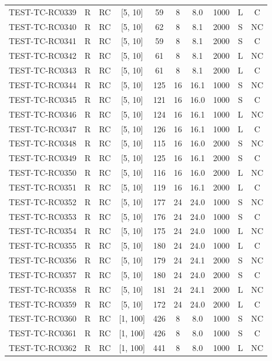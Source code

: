 \begin{longtable}{lccccccccc}
TEST-TC-RC0339 & R & RC & [5, 10] & 59 & 8 & 8.0 & 1000 & L & C \\
TEST-TC-RC0340 & R & RC & [5, 10] & 62 & 8 & 8.1 & 2000 & S & NC \\
TEST-TC-RC0341 & R & RC & [5, 10] & 59 & 8 & 8.1 & 2000 & S & C \\
TEST-TC-RC0342 & R & RC & [5, 10] & 61 & 8 & 8.1 & 2000 & L & NC \\
TEST-TC-RC0343 & R & RC & [5, 10] & 61 & 8 & 8.1 & 2000 & L & C \\
TEST-TC-RC0344 & R & RC & [5, 10] & 125 & 16 & 16.1 & 1000 & S & NC \\
TEST-TC-RC0345 & R & RC & [5, 10] & 121 & 16 & 16.0 & 1000 & S & C \\
TEST-TC-RC0346 & R & RC & [5, 10] & 124 & 16 & 16.1 & 1000 & L & NC \\
TEST-TC-RC0347 & R & RC & [5, 10] & 126 & 16 & 16.1 & 1000 & L & C \\
TEST-TC-RC0348 & R & RC & [5, 10] & 115 & 16 & 16.0 & 2000 & S & NC \\
TEST-TC-RC0349 & R & RC & [5, 10] & 125 & 16 & 16.1 & 2000 & S & C \\
TEST-TC-RC0350 & R & RC & [5, 10] & 116 & 16 & 16.0 & 2000 & L & NC \\
TEST-TC-RC0351 & R & RC & [5, 10] & 119 & 16 & 16.1 & 2000 & L & C \\
TEST-TC-RC0352 & R & RC & [5, 10] & 177 & 24 & 24.0 & 1000 & S & NC \\
TEST-TC-RC0353 & R & RC & [5, 10] & 176 & 24 & 24.0 & 1000 & S & C \\
TEST-TC-RC0354 & R & RC & [5, 10] & 175 & 24 & 24.0 & 1000 & L & NC \\
TEST-TC-RC0355 & R & RC & [5, 10] & 180 & 24 & 24.0 & 1000 & L & C \\
TEST-TC-RC0356 & R & RC & [5, 10] & 179 & 24 & 24.1 & 2000 & S & NC \\
TEST-TC-RC0357 & R & RC & [5, 10] & 180 & 24 & 24.0 & 2000 & S & C \\
TEST-TC-RC0358 & R & RC & [5, 10] & 181 & 24 & 24.1 & 2000 & L & NC \\
TEST-TC-RC0359 & R & RC & [5, 10] & 172 & 24 & 24.0 & 2000 & L & C \\
TEST-TC-RC0360 & R & RC & [1, 100] & 426 & 8 & 8.0 & 1000 & S & NC \\
TEST-TC-RC0361 & R & RC & [1, 100] & 426 & 8 & 8.0 & 1000 & S & C \\
TEST-TC-RC0362 & R & RC & [1, 100] & 441 & 8 & 8.0 & 1000 & L & NC \\

\end{longtable}
